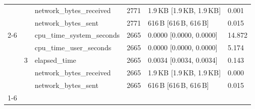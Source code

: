 \begin{tabular}{lllrll}
 &  & network_bytes_received & 2771 & 1.9\,KB [1.9\,KB, 1.9\,KB] & 0.001 \\
 &  & network_bytes_sent & 2771 & 616\,B [616\,B, 616\,B] & 0.015 \\
\cline{2-6}
 & \multirow[t]{5}{*}{3} & cpu_time_system_seconds & 2665 & 0.0000 [0.0000, 0.0000] & 14.872 \\
 &  & cpu_time_user_seconds & 2665 & 0.0000 [0.0000, 0.0000] & 5.174 \\
 &  & elapsed_time & 2665 & 0.0034 [0.0034, 0.0034] & 0.143 \\
 &  & network_bytes_received & 2665 & 1.9\,KB [1.9\,KB, 1.9\,KB] & 0.000 \\
 &  & network_bytes_sent & 2665 & 616\,B [616\,B, 616\,B] & 0.015 \\
\cline{1-6} \cline{2-6}
\bottomrule
\end{tabular}
